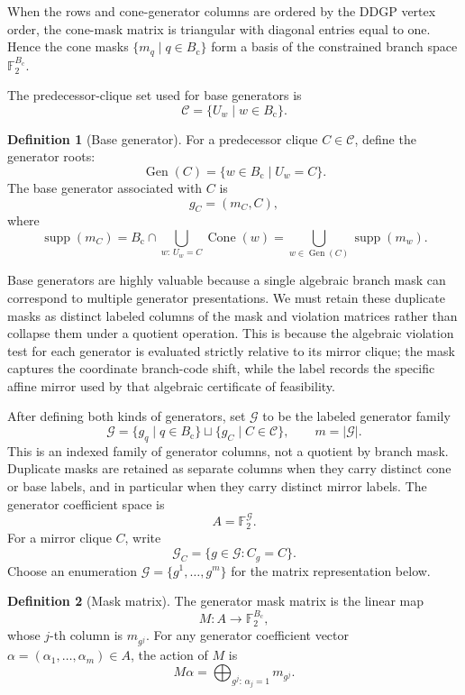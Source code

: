 \documentclass[11pt]{article}
\theoremstyle{plain}
\theoremstyle{definition}
\newtheorem{definition}{Definition}
\begin{document}
When the rows and cone-generator columns are ordered by the DDGP vertex order, the cone-mask matrix is triangular with diagonal entries equal to one. Hence the cone masks $\{m_q \mid q\in B_{\mathrm{c}}\}$ form a basis of the constrained branch space $\mathbb{F}_2^{B_{\mathrm{c}}}$.

The predecessor-clique set used for base generators is
\[
\mathcal{C}=\{U_w\mid w\in B_{\mathrm{c}}\}.
\]

\begin{definition}[Base generator]
\label{def:base-generator}
For a predecessor clique $C\in\mathcal{C}$, define the generator roots:
\[
\operatorname{Gen}(C)=\{w \in B_{\mathrm{c}} \mid U_w = C\}.
\]
The base generator associated with $C$ is
\[
g_C=(m_C, C),
\]
where
\[
\operatorname{supp}(m_C)
=
B_{\mathrm{c}} \cap \bigcup_{w:\,U_w=C} \operatorname{Cone}(w)
=
\bigcup_{w\in \operatorname{Gen}(C)} \operatorname{supp}(m_w).
\]
\end{definition}

Base generators are highly valuable because a single algebraic branch mask can correspond to multiple generator presentations. We must retain these duplicate masks as distinct labeled columns of the mask and violation matrices rather than collapse them under a quotient operation. This is because the algebraic violation test for each generator is evaluated strictly relative to its mirror clique; the mask captures the coordinate branch-code shift, while the label records the specific affine mirror used by that algebraic certificate of feasibility.

After defining both kinds of generators, set $\mathcal{G}$ to be the labeled generator family
\[
\mathcal{G}
=
\{g_q\mid q\in B_{\mathrm{c}}\}\sqcup\{g_C\mid C\in\mathcal{C}\},
\qquad
m=\lvert\mathcal{G}\rvert.
\]
This is an indexed family of generator columns, not a quotient by branch mask. Duplicate masks are retained as separate columns when they carry distinct cone or base labels, and in particular when they carry distinct mirror labels. The generator coefficient space is
\[
A = \mathbb{F}_2^{\mathcal{G}}.
\]
For a mirror clique $C$, write
\[
\mathcal{G}_C=\{g\in\mathcal{G}: C_g=C\}.
\]
Choose an enumeration $\mathcal{G}=\{g^1,\ldots,g^m\}$ for the matrix representation below.

\begin{definition}[Mask matrix]
\label{def:mask-matrix}
The generator mask matrix is the linear map
\[
M: A \to \mathbb{F}_2^{B_{\mathrm{c}}},
\]
whose $j$-th column is $m_{g^j}$. For any generator coefficient vector $\alpha=(\alpha_1,\ldots,\alpha_m)\in A$, the action of $M$ is
\[
M\alpha = \bigoplus_{g^j:\,\alpha_j = 1} m_{g^j}.
\]
\end{definition}
\end{document}
